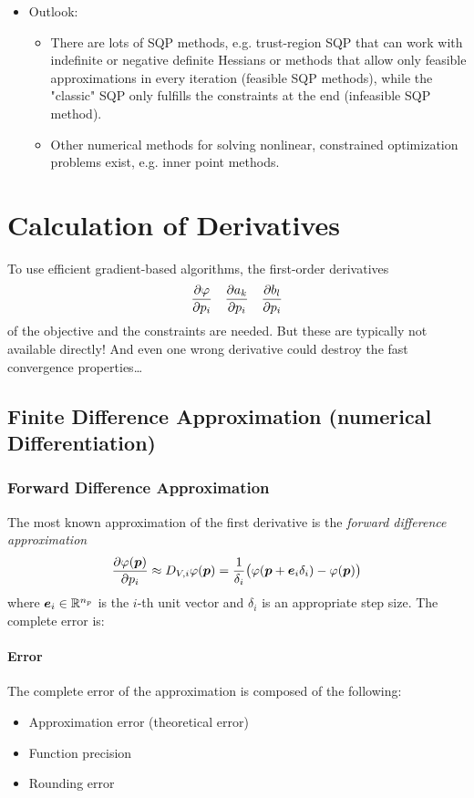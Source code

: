\begin{itemize}
\begin{itemize}
					\end{itemize}
				\item Outlook:
					\begin{itemize}
						\item There are lots of SQP methods, e.g. trust-region SQP that can work with indefinite or negative definite Hessians or methods that allow only feasible approximations in every iteration (feasible SQP methods), while the "classic" SQP only fulfills the constraints at the end (infeasible SQP method).
						\item Other numerical methods for solving nonlinear, constrained optimization problems exist, e.g. inner point methods.
					\end{itemize}
			\end{itemize}

\chapter{Calculation of Derivatives}
	To use efficient gradient-based algorithms, the first-order derivatives
	\begin{align*}
		\pdv{\varphi}{p_i} && \pdv{a_k}{p_i} && \pdv{b_l}{p_i}
	\end{align*}
	of the objective and the constraints are needed. But these are typically not available directly! And even one wrong derivative could destroy the fast convergence properties\dots

	\section{Finite Difference Approximation (numerical Differentiation)}
		\subsection{Forward Difference Approximation}
			The most known approximation of the first derivative  is the \emph{forward difference approximation}
			\begin{align*}
				\pdv{\varphi(\bm{p})}{p_i} \approx D_{V, i} \varphi(\bm{p}) = \frac{1}{\delta_i} \big( \varphi(\bm{p} + \bm{e}_i \delta_i) - \varphi(\bm{p}) \big)
			\end{align*}
			where \( \bm{e}_i \in \mathbb{R}^{n_p} \) is the \(i\)-th unit vector and \(\delta_i\) is an appropriate step size. The complete error is:

			\subsubsection{Error}
				The complete error of the approximation is composed of the following:
				\begin{itemize}
					\item Approximation error (theoretical error)
					\item Function precision
					\item Rounding error
				\end{itemize}

